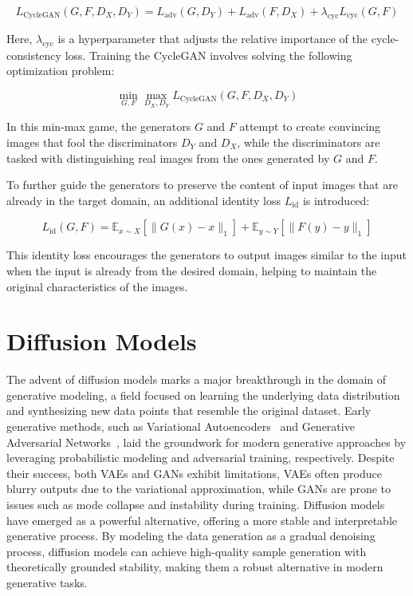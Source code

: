 \documentclass[12pt,DIV14,BCOR12mm,a4paper,footinclude=false,headinclude,parskip=half-,twoside,openright,cleardoublepage=empty,toc=index,bibliography=totoc,listof=totoc]{scrreprt}
\numberwithin{equation}{chapter}
\begin{document}
\begin{equation}
L_{\text{CycleGAN}}(G, F, D_X, D_Y) = L_{\text{adv}}(G, D_Y) + L_{\text{adv}}(F, D_X) + \lambda_{\text{cyc}} L_{\text{cyc}}(G, F)
\end{equation}

Here, \(\lambda_{\text{cyc}}\) is a hyperparameter that adjusts the relative importance of the cycle-consistency loss. Training the CycleGAN involves solving the following optimization problem:

\begin{equation}
\min_{G, F} \max_{D_X, D_Y} L_{\text{CycleGAN}}(G, F, D_X, D_Y)
\end{equation}

In this min-max game, the generators \(G\) and \(F\) attempt to create convincing images that fool the discriminators \(D_Y\) and \(D_X\), while the discriminators are tasked with distinguishing real images from the ones generated by \(G\) and \(F\).

To further guide the generators to preserve the content of input images that are already in the target domain, an additional identity loss \(L_{\text{id}}\) is introduced:

\begin{equation}
L_{\text{id}}(G, F) = \mathbb{E}_{x \sim X} [\| G(x) - x \|_1] + \mathbb{E}_{y \sim Y} [\| F(y) - y \|_1]
\end{equation}

This identity loss encourages the generators to output images similar to the input when the input is already from the desired domain, helping to maintain the original characteristics of the images.
\section{Diffusion Models}
\label{sec:diffusion_model_theory}
The advent of diffusion models marks a major breakthrough in the domain of generative modeling, a field focused on learning the underlying data distribution and synthesizing new data points that resemble the original dataset. Early generative methods, such as Variational Autoencoders~\cite{VAE} and Generative Adversarial Networks~\cite{goodfellow2014generative}, laid the groundwork for modern generative approaches by leveraging probabilistic modeling and adversarial training, respectively. Despite their success, both VAEs and GANs exhibit limitations, VAEs often produce blurry outputs due to the variational approximation, while GANs are prone to issues such as mode collapse and instability during training. Diffusion models~\cite{diffusion1,diffusion2} have emerged as a powerful alternative, offering a more stable and interpretable generative process. By modeling the data generation as a gradual denoising process, diffusion models can achieve high-quality sample generation with theoretically grounded stability, making them a robust alternative in modern generative tasks.
\end{document}
